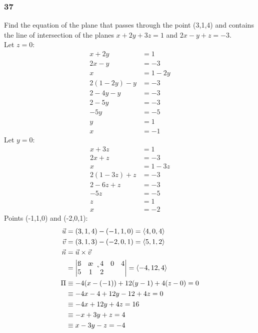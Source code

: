 \documentclass{math}
\begin{document}
\subsubsection*{37}
Find the equation of the plane that passes through the point (3,1,4) and
contains the line of intersection of the planes \( x+2y+3z = 1 \) and
\( 2x-y+z = -3 \). \\
Let \( z = 0 \):
\begin{align*}
  x+2y &= 1 \\
  2x-y &= -3 \\
  x &= 1-2y \\
  2(1-2y)-y &= -3 \\
  2-4y-y &= -3 \\
  2-5y &= -3 \\
  -5y &= -5 \\
  y &= 1 \\
  x &= -1
\end{align*}
Let \( y = 0 \):
\begin{align*}
  x+3z &= 1 \\
  2x+z &= -3 \\
  x &= 1-3z \\
  2(1-3z)+z &= -3 \\
  2-6z+z &= -3 \\
  -5z &= -5 \\
  z &= 1 \\
  x &= -2
\end{align*}
Points (-1,1,0) and (-2,0,1):
\begin{align*}
  \vec{u} &= (3,1,4)-(-1,1,0) = \langle4,0,4\rangle \\
  \vec{v} &= (3,1,3)-(-2,0,1) = \langle5,1,2\rangle \\
  \vec{n} &= \vec{u}\times\vec{v} \\
  &= \begin{vmatrix}
    \i & \j & \k \\
    4 & 0 & 4 \\
    5 & 1 & 2 \\
  \end{vmatrix} = \langle-4,12,4\rangle \\
  \Pi &\equiv -4(x-(-1))+12(y-1)+4(z-0) = 0 \\
  &\equiv -4x-4+12y-12+4z = 0 \\
  &\equiv -4x+12y+4z = 16 \\
  &\equiv -x+3y+z = 4 \\
  &\equiv x-3y-z = -4
\end{align*}
\end{document}

